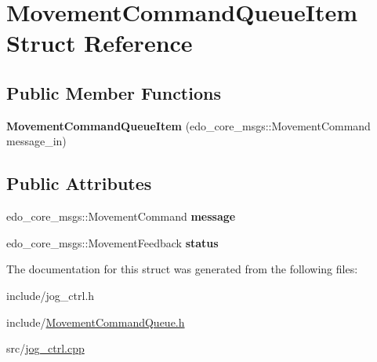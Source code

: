 \hypertarget{classMovementCommandQueueItem}{}\section{Movement\+Command\+Queue\+Item Struct Reference}
\label{classMovementCommandQueueItem}
\subsection*{Public Member Functions}
\begin{DoxyCompactItemize}
\item 
{\bfseries Movement\+Command\+Queue\+Item} (edo\+\_\+core\+\_\+msgs\+::\+Movement\+Command message\+\_\+in)\hypertarget{classMovementCommandQueueItem_a1f7dc9f2c2a9ae62db1692d84a2c84cb}{}\label{classMovementCommandQueueItem_a1f7dc9f2c2a9ae62db1692d84a2c84cb}

\end{DoxyCompactItemize}
\subsection*{Public Attributes}
\begin{DoxyCompactItemize}
\item 
edo\+\_\+core\+\_\+msgs\+::\+Movement\+Command {\bfseries message}\hypertarget{classMovementCommandQueueItem_a1a1cdf0a3174a55b0cd7e408d7da8932}{}\label{classMovementCommandQueueItem_a1a1cdf0a3174a55b0cd7e408d7da8932}

\item 
edo\+\_\+core\+\_\+msgs\+::\+Movement\+Feedback {\bfseries status}\hypertarget{classMovementCommandQueueItem_aa509cac8388938868457ae6028b0247c}{}\label{classMovementCommandQueueItem_aa509cac8388938868457ae6028b0247c}

\end{DoxyCompactItemize}


The documentation for this struct was generated from the following files\+:\begin{DoxyCompactItemize}
\item 
include/jog\+\_\+ctrl.\+h\item 
include/\hyperlink{MovementCommandQueue_8h}{Movement\+Command\+Queue.\+h}\item 
src/\hyperlink{jog__ctrl_8cpp}{jog\+\_\+ctrl.\+cpp}\end{DoxyCompactItemize}

